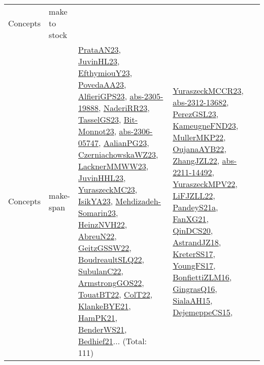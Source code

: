 {\begin{longtable}{lp{3cm}>{\raggedright}p{6cm}>{\raggedright}p{6cm}p{8cm}}
Concepts & make to stock &  &  & \\
Concepts & make-span & \href{articles/PrataAN23.pdf}{PrataAN23}\cite{PrataAN23}, \href{papers/JuvinHL23.pdf}{JuvinHL23}\cite{JuvinHL23}, \href{papers/EfthymiouY23.pdf}{EfthymiouY23}\cite{EfthymiouY23}, \href{papers/PovedaAA23.pdf}{PovedaAA23}\cite{PovedaAA23}, \href{articles/AlfieriGPS23.pdf}{AlfieriGPS23}\cite{AlfieriGPS23}, \href{articles/abs-2305-19888.pdf}{abs-2305-19888}\cite{abs-2305-19888}, \href{articles/NaderiRR23.pdf}{NaderiRR23}\cite{NaderiRR23}, \href{papers/TasselGS23.pdf}{TasselGS23}\cite{TasselGS23}, \href{papers/Bit-Monnot23.pdf}{Bit-Monnot23}\cite{Bit-Monnot23}, \href{articles/abs-2306-05747.pdf}{abs-2306-05747}\cite{abs-2306-05747}, \href{papers/AalianPG23.pdf}{AalianPG23}\cite{AalianPG23}, \href{articles/CzerniachowskaWZ23.pdf}{CzerniachowskaWZ23}\cite{CzerniachowskaWZ23}, \href{articles/LacknerMMWW23.pdf}{LacknerMMWW23}\cite{LacknerMMWW23}, \href{papers/JuvinHHL23.pdf}{JuvinHHL23}\cite{JuvinHHL23}, \href{papers/YuraszeckMC23.pdf}{YuraszeckMC23}\cite{YuraszeckMC23}, \href{articles/IsikYA23.pdf}{IsikYA23}\cite{IsikYA23}, \href{papers/Mehdizadeh-Somarin23.pdf}{Mehdizadeh-Somarin23}\cite{Mehdizadeh-Somarin23}, \href{articles/HeinzNVH22.pdf}{HeinzNVH22}\cite{HeinzNVH22}, \href{articles/AbreuN22.pdf}{AbreuN22}\cite{AbreuN22}, \href{papers/GeitzGSSW22.pdf}{GeitzGSSW22}\cite{GeitzGSSW22}, \href{papers/BoudreaultSLQ22.pdf}{BoudreaultSLQ22}\cite{BoudreaultSLQ22}, \href{articles/SubulanC22.pdf}{SubulanC22}\cite{SubulanC22}, \href{papers/ArmstrongGOS22.pdf}{ArmstrongGOS22}\cite{ArmstrongGOS22}, \href{papers/TouatBT22.pdf}{TouatBT22}\cite{TouatBT22}, \href{articles/ColT22.pdf}{ColT22}\cite{ColT22}, \href{papers/KlankeBYE21.pdf}{KlankeBYE21}\cite{KlankeBYE21}, \href{articles/HamPK21.pdf}{HamPK21}\cite{HamPK21}, \href{papers/BenderWS21.pdf}{BenderWS21}\cite{BenderWS21}, \href{articles/Bedhief21.pdf}{Bedhief21}\cite{Bedhief21}... (Total: 111) & \href{articles/YuraszeckMCCR23.pdf}{YuraszeckMCCR23}\cite{YuraszeckMCCR23}, \href{articles/abs-2312-13682.pdf}{abs-2312-13682}\cite{abs-2312-13682}, \href{papers/PerezGSL23.pdf}{PerezGSL23}\cite{PerezGSL23}, \href{papers/KameugneFND23.pdf}{KameugneFND23}\cite{KameugneFND23}, \href{articles/MullerMKP22.pdf}{MullerMKP22}\cite{MullerMKP22}, \href{papers/OujanaAYB22.pdf}{OujanaAYB22}\cite{OujanaAYB22}, \href{papers/ZhangJZL22.pdf}{ZhangJZL22}\cite{ZhangJZL22}, \href{articles/abs-2211-14492.pdf}{abs-2211-14492}\cite{abs-2211-14492}, \href{articles/YuraszeckMPV22.pdf}{YuraszeckMPV22}\cite{YuraszeckMPV22}, \href{papers/LiFJZLL22.pdf}{LiFJZLL22}\cite{LiFJZLL22}, \href{articles/PandeyS21a.pdf}{PandeyS21a}\cite{PandeyS21a}, \href{articles/FanXG21.pdf}{FanXG21}\cite{FanXG21}, \href{articles/QinDCS20.pdf}{QinDCS20}\cite{QinDCS20}, \href{papers/AstrandJZ18.pdf}{AstrandJZ18}\cite{AstrandJZ18}, \href{articles/KreterSS17.pdf}{KreterSS17}\cite{KreterSS17}, \href{papers/YoungFS17.pdf}{YoungFS17}\cite{YoungFS17}, \href{papers/BonfiettiZLM16.pdf}{BonfiettiZLM16}\cite{BonfiettiZLM16}, \href{papers/GingrasQ16.pdf}{GingrasQ16}\cite{GingrasQ16}, \href{papers/SialaAH15.pdf}{SialaAH15}\cite{SialaAH15}, \href{papers/DejemeppeCS15.pdf}{DejemeppeCS15}\cite{DejemeppeCS15}, 
\end{longtable}}
